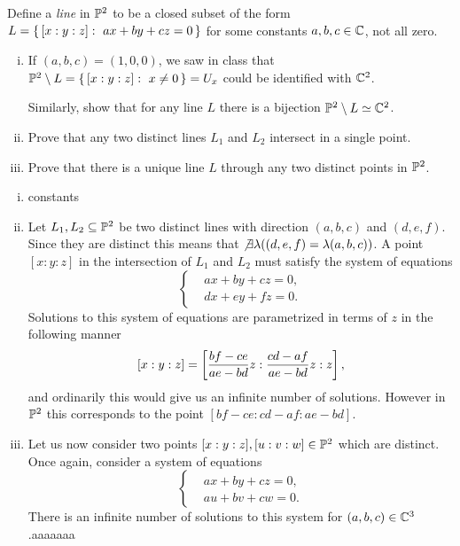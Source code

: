 \documentclass[12pt]{memoir}
\begin{document}
\begin{Ej}
 Define a \emph{line} in $\mathbb{P}^2$ to be a closed subset of the form $L=\{\,[x:y:z]:\ ax+by+cz=0\,\}$ for some constants $a,b,c\in\mathbb{C}$, not all zero.
 \begin{enumerate}[i)]
  \itemsep=-0.4em
  \item If $(a,b,c)=(1,0,0)$, we saw in class that $\mathbb{P}^2\setminus L=\{\,[x:y:z]:\ x\neq 0\,\}=U_x$ could be identified with $\mathbb{C}^2$.\par 
  Similarly, show that for any line $L$ there is a bijection $\mathbb{P}^2\setminus L\simeq \mathbb{C}^2$.
  \item Prove that any two distinct lines $L_1$ and $L_2$ intersect in a single point.
  \item Prove that there is a unique line $L$ through any two distinct points in $\mathbb{P}^2$.
 \end{enumerate}
\end{Ej}

\begin{ptcbr}
  \begin{enumerate}[i)]
    \itemsep=-0.4em
    \item constants
    \item Let $L_1,L_2\subseteq\mathbb{P}^2$ be two distinct lines with direction $(a,b,c)$ and $(d,e,f)$. Since they are distinct this means that $\not\exists\lambda((d,e,f)=\lambda(a,b,c))$. A point $[x:y:z]$ in the intersection of $L_1$ and $L_2$ must satisfy the system of equations
    $$
    \left\lbrace
    \begin{aligned}
      &ax+by+cz=0,\\
      &dx+ey+fz=0.
    \end{aligned}
    \right.
    $$
    Solutions to this system of equations are parametrized in terms of $z$ in the following manner
    $$[x:y:z]=\left\lbrack\frac{bf-ce}{ae-bd}z:\frac{cd-af}{ae-bd}z:z\right\rbrack,$$
    and ordinarily this would give us an infinite number of solutions. However in $\mathbb{P}^2$ this corresponds to the point $[bf-ce:cd-af:ae-bd]$.
    \item Let us now consider two points $[x:y:z],[u:v:w]\in\mathbb{P}^2$ which are distinct. Once again, consider a system of equations 
    $$
    \left\lbrace
    \begin{aligned}
      &ax+by+cz=0,\\
      &au+bv+cw=0.
    \end{aligned}
    \right.
    $$
    There is an infinite number of solutions to this system for $(a,b,c)\in\mathbb{C}^3$.aaaaaaa
  \end{enumerate}
  \end{ptcbr}
\end{document}
